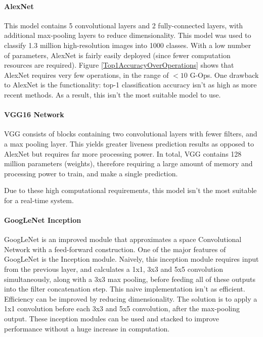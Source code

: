 \documentclass[10pt,a4paper]{article}
\begin{document}
            \paragraph{AlexNet} 
            This model contains 5 convolutional layers and 2 fully-connected layers, with additional max-pooling layers to reduce dimensionality. 
            This model was used to classify 1.3 million high-resolution images into 1000 classes. \cite{AlexNet} 
            With a low number of parameters, AlexNet is fairly easily deployed (since fewer computation resources are required). Figure \ref{Top1AccuracyOverOperations}
            shows that AlexNet requires very few operations, in the range of $<10$ G-Ops. 
            One drawback to AlexNet is the functionality: top-1 classification accuracy isn't as high as more recent methods. As a result, this isn't the most suitable model to use.
            \cite{DeepNeuralNetworkDeployability}
            
            \paragraph{VGG16 Network}
            VGG consists of blocks containing two convolutional layers with fewer filters, and a max pooling layer.  This yields greater liveness prediction results as opposed to AlexNet but requires far more processing power.
            In total, VGG contains 128 million parameters (weights), therefore requiring a large amount of memory and processing power to train, and make a single prediction. 
            \cite{DeepNeuralNetworkDeployability} 
            
            Due to these high computational requirements, this model isn't the most suitable for a real-time system.

            \paragraph{GoogLeNet Inception}
            
            GoogLeNet is an improved module that approximates a space Convolutional Network with a feed-forward construction. One of the major features of GoogLeNet is the Inception module.
            Naively, this inception module requires input from the previous layer, and calculates a 1x1, 3x3 and 5x5 convolution simultaneously, along with a 3x3 max pooling, before feeding all of these outputs into the filter concatenation step. 
            This naive implementation isn't as efficient. Efficiency can be improved by reducing dimensionality. The solution is to apply a 1x1 convolution before each 3x3 and 5x5 convolution, after the max-pooling output. 
            These inception modules can be used and stacked to improve performance without a huge increase in computation. \cite{GoogLeNet} 
            
\end{document}
